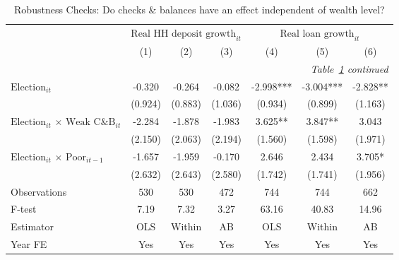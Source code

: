 \begin{longtable}{m{4.5cm}*{6}{c}}                                         \caption{Robustness Checks: Do checks \& balances have an effect independent of wealth level?\label{robustindices1}}\\                                         \toprule                                         &\multicolumn{3}{c}{$\text{Real HH deposit growth}_{it}$} & \multicolumn{3}{c}{$\text{Real loan growth}_{it}$} \\ \cmidrule(lr){2-4} \cmidrule(lr){5-7}
                    &         (1)   &         (2)   &         (3)   &         (4)   &         (5)   &         (6)   \\
\midrule\endfirsthead                                         \multicolumn{7}{r}{\textit{Table~\ref{robustindices1} continued}} \\                                         \toprule\endhead\midrule\endfoot\endlastfoot
$\text{Election}_{it}$&      -0.320   &      -0.264   &      -0.082   &      -2.998***&      -3.004***&      -2.828** \\
                    &     (0.924)   &     (0.883)   &     (1.036)   &     (0.934)   &     (0.899)   &     (1.163)   \\
$\text{Election}_{it}$ $\times$ $\text{Weak C\&B}_{it}$&      -2.284   &      -1.878   &      -1.983   &       3.625** &       3.847** &       3.043   \\
                    &     (2.150)   &     (2.063)   &     (2.194)   &     (1.560)   &     (1.598)   &     (1.971)   \\
$\text{Election}_{it}$ $\times$ $\text{Poor}_{it-1}$&      -1.657   &      -1.959   &      -0.170   &       2.646   &       2.434   &       3.705*  \\
                    &     (2.632)   &     (2.643)   &     (2.580)   &     (1.742)   &     (1.741)   &     (1.956)   \\
\midrule
Observations        &         530   &         530   &         472   &         744   &         744   &         662   \\
F-test              &        7.19   &        7.32   &        3.27   &       63.16   &       40.83   &       14.96   \\
Estimator           &         OLS   &      Within   &          AB   &         OLS   &      Within   &          AB   \\
Year FE             &         Yes   &         Yes   &         Yes   &         Yes   &         Yes   &         Yes   \\

\end{longtable}

